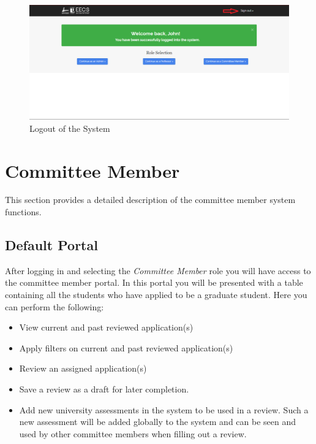 \documentclass[fontsize=12pt,paper=letter,twoside]{scrartcl}
\begin{document}
\begin{figure}[!htb]
\begin{center}
\includegraphics[width=.99\textwidth]{images/logout.png}
\end{center}
\caption{Logout of the System}
\label{fig:logout}
\end{figure}


\newpage
\section{Committee Member}
This section provides a detailed description of the committee member system functions.

\subsection{Default Portal}
After logging in and selecting the \emph{Committee Member} role you will have access to the committee member portal. In this portal you will be presented with a table containing all the students who have applied to be a graduate student. Here you can perform the following:
\begin{itemize}
\item View current and past reviewed application(s)
\item Apply filters on current and past reviewed application(s)
\item Review an assigned application(s)
\item Save a review as a draft for later completion.
\item Add new university assessments in the system to be used in a review. Such a new assessment will be added globally to the system and can be seen and used by other committee members when filling out a review.
\end{itemize} 
\end{document}
